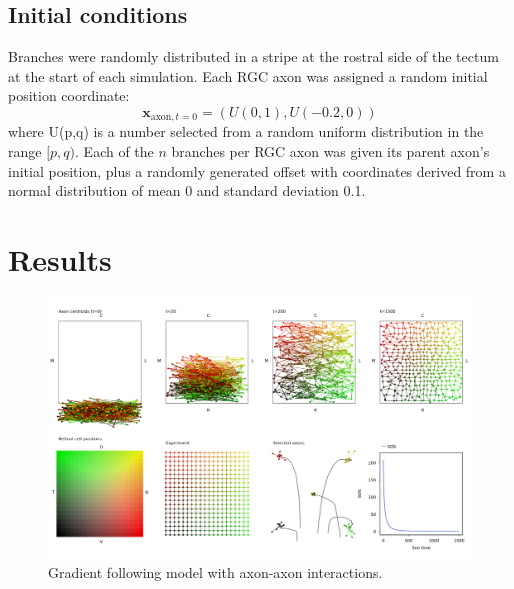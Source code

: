 \documentclass[11pt, a4paper]{article}
\begin{document}
\subsection*{Initial conditions}

Branches were randomly distributed in a stripe at the rostral side of the
tectum at the start of each simulation. Each RGC axon was assigned a random
initial position coordinate:
\begin{equation}
\mathbf{x}_{\text{axon},t=0} = (U(0,1), U(-0.2,0))
\end{equation}
where U(p,q) is a number selected from a random uniform distribution in the
range $[p,q)$. Each of the $n$ branches per RGC axon was given its parent
axon's initial position, plus a randomly generated offset with coordinates
derived from a normal distribution of mean 0 and standard deviation 0.1.

\section{Results}

\begin{figure}
\includegraphics[width=\linewidth]{./images/j4_ee_wt.png}
\caption{Gradient following model with axon-axon interactions.}
\label{f:wt}
\end{figure}
\end{document}
